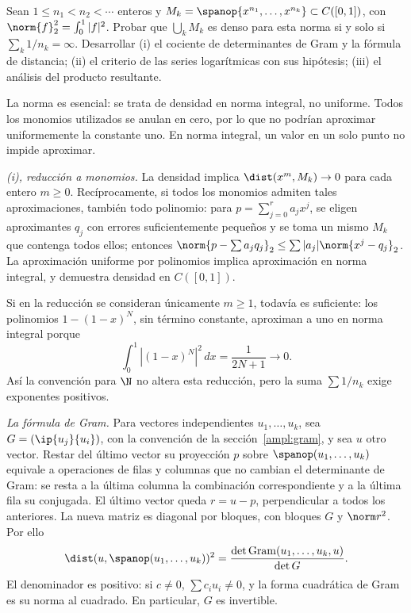 \begin{ejercicio}\label{ej:lectura-31-4}
Sean $1\leq n_1<n_2<\cdots$ enteros y $M_k=\spanop\{x^{n_1},\dots,x^{n_k}\}\subset C([0,1])$, con $\norm{f}_2^{2}=\int_0^1|f|^{2}$. Probar que $\bigcup_kM_k$ es denso para esta norma si y solo si $\sum_k1/n_k=\infty$. Desarrollar (i) el cociente de determinantes de Gram y la fórmula de distancia; (ii) el criterio de las series logarítmicas con sus hipótesis; (iii) el análisis del producto resultante.
\end{ejercicio}
\begin{solucion}
La norma es esencial: se trata de densidad en norma integral, no uniforme. Todos los monomios utilizados se anulan en cero, por lo que no podrían aproximar uniformemente la constante uno. En norma integral, un valor en un solo punto no impide aproximar.

\emph{(i), reducción a monomios.} La densidad implica $\dist(x^m,M_k)\to0$ para cada entero $m\geq0$. Recíprocamente, si todos los monomios admiten tales aproximaciones, también todo polinomio: para $p=\sum_{j=0}^{r}a_jx^j$, se eligen aproximantes $q_j$ con errores suficientemente pequeños y se toma un mismo $M_k$ que contenga todos ellos; entonces $\norm{p-\sum a_jq_j}_2\leq\sum|a_j|\norm{x^j-q_j}_2$. La aproximación uniforme por polinomios implica aproximación en norma integral, y demuestra densidad en $C([0,1])$.

Si en la reducción se consideran únicamente $m\geq1$, todavía es suficiente: los polinomios $1-(1-x)^N$, sin término constante, aproximan a uno en norma integral porque
\[
 \int_0^1|(1-x)^N|^{2}\,dx=\frac1{2N+1}\longrightarrow0.
\]
Así la convención para $\N$ no altera esta reducción, pero la suma $\sum1/n_k$ exige exponentes positivos.

\emph{La fórmula de Gram.} Para vectores independientes $u_1,\dots,u_k$, sea $G=(\ip{u_j}{u_i})$, con la convención de la sección~\ref{ampl:gram}, y sea $u$ otro vector. Restar del último vector su proyección $p$ sobre $\spanop(u_1,\dots,u_k)$ equivale a operaciones de filas y columnas que no cambian el determinante de Gram: se resta a la última columna la combinación correspondiente y a la última fila su conjugada. El último vector queda $r=u-p$, perpendicular a todos los anteriores. La nueva matriz es diagonal por bloques, con bloques $G$ y $\norm r^{2}$. Por ello
\[
 \dist(u,\spanop(u_1,\dots,u_k))^{2}
 =\frac{\det\operatorname{Gram}(u_1,\dots,u_k,u)}{\det G}.
\]
El denominador es positivo: si $c\ne0$, $\sum c_iu_i\ne0$, y la forma cuadrática de Gram es su norma al cuadrado. En particular, $G$ es invertible.


\end{solucion}
